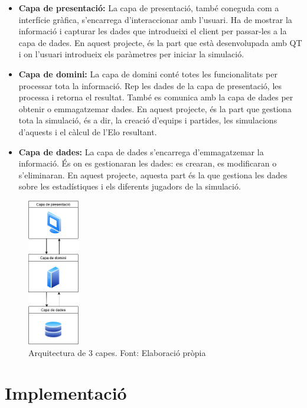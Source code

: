 \documentclass[a4paper]{article}
\begin{document}
\begin{itemize}
    \item \textbf{Capa de presentació:} La capa de presentació, també coneguda com a interfície gràfica, s'encarrega d'interaccionar amb l'usuari. Ha de mostrar la informació i capturar les dades que introdueixi el client per passar-les a la capa de dades. En aquest projecte, és la part que està desenvolupada amb QT i on l'usuari introdueix els paràmetres per iniciar la simulació.
    
    \item \textbf{Capa de domini:} La capa de domini conté totes les funcionalitats per processar tota la informació. Rep les dades de la capa de presentació, les processa i retorna el resultat. També es comunica amb la capa de dades per obtenir o emmagatzemar dades. En aquest projecte, és la part que gestiona tota la simulació, és a dir, la creació d'equips i partides, les simulacions d'aquests i el càlcul de l'Elo resultant.
    
    \item \textbf{Capa de dades:} La capa de dades s'encarrega d'emmagatzemar la informació. És on es gestionaran les dades: es crearan, es modificaran o s'eliminaran. En aquest projecte, aquesta part és la que gestiona les dades sobre les estadístiques i els diferents jugadors de la simulació.
\end{itemize}


\begin{figure}
    \centering
    \includegraphics[width=0.2\textwidth]{images/3-capes.png}
    \caption{Arquitectura de 3 capes. Font: Elaboració pròpia}
    \label{fig:ArchitectureCapes}
\end{figure}



\newpage
\section{Implementació}
\end{document}
